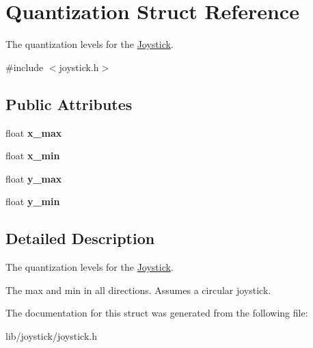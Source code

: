 \hypertarget{struct_quantization}{}\section{Quantization Struct Reference}
\label{struct_quantization}


The quantization levels for the \hyperlink{class_joystick}{Joystick}.  




{\ttfamily \#include $<$joystick.\+h$>$}

\subsection*{Public Attributes}
\begin{DoxyCompactItemize}
\item 
\hypertarget{struct_quantization_a49ed52aa6f82f23bd57d2213ec8f4132}{}\label{struct_quantization_a49ed52aa6f82f23bd57d2213ec8f4132} 
float {\bfseries x\+\_\+max}
\item 
\hypertarget{struct_quantization_a6239395ee60948e02b37d5eee8714a67}{}\label{struct_quantization_a6239395ee60948e02b37d5eee8714a67} 
float {\bfseries x\+\_\+min}
\item 
\hypertarget{struct_quantization_ab49ddf34f17534a7db9b25a77970d9a3}{}\label{struct_quantization_ab49ddf34f17534a7db9b25a77970d9a3} 
float {\bfseries y\+\_\+max}
\item 
\hypertarget{struct_quantization_a390def64c5c6aeffffe43fdecc989579}{}\label{struct_quantization_a390def64c5c6aeffffe43fdecc989579} 
float {\bfseries y\+\_\+min}
\end{DoxyCompactItemize}


\subsection{Detailed Description}
The quantization levels for the \hyperlink{class_joystick}{Joystick}. 

The max and min in all directions. Assumes a circular joystick. 

The documentation for this struct was generated from the following file\+:\begin{DoxyCompactItemize}
\item 
lib/joystick/joystick.\+h\end{DoxyCompactItemize}
